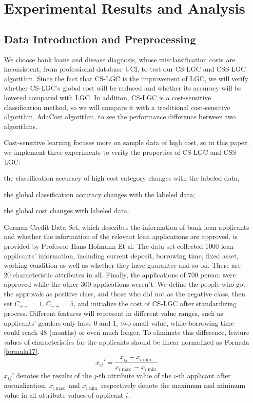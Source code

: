 \documentclass{svjour3}                     %
\begin{document}
\section{Experimental Results and Analysis}
\subsection{Data Introduction and Preprocessing}\label{sec:preexp}
We choose bank loans and disease diagnosis, whose misclassification costs are inconsistent, from professional database UCI\cite{Lichman:2013}, to
test our CS-LGC and CSS-LGC algorithm. Since the fact that CS-LGC is the improvement of LGC, we will verify whether CS-LGC’s global cost will be reduced and whether its accuracy will be lowered compared with LGC. In addition, CS-LGC is a cost-sensitive classification method, so we will compare it with a traditional cost-sensitive algorithm, AdaCost algorithm, to see the performance difference between two algorithms.

Cost-sensitive learning focuses more on sample data of high cost, so in this paper, we implement three experiments to verity the properties of CS-LGC and CSS-LGC:
\begin{inparaenum}[(1)]
  \item the classification accuracy of high cost category changes with the labeled data;
  \item the global classification accuracy changes with the labeled data;
  \item the global cost changes with labeled data.
\end{inparaenum}

German Credit Data Set\cite{germandata}, which describes the information of bank loan applicants and whether the information of the relevant loan applications are approved, is provided by Professor Hans Hofmann Et al. The data set collected 1000 loan applicants' information, including current deposit, borrowing time, fixed asset, working condition as well as whether they have guarantee and so on. There are 20 characteristic attributes in all. Finally, the applications of 700 person were approved while the other 300 applications weren't. We define the people who got the approvals as positive class, and those who did not as the negative class, then set ${C_{ +  - }} = 1$, ${C_{ -  + }} = 5$, and initialize the cost of CS-LGC after standardizing process. Different features will represent in different value ranges, such as applicants' genders only have 0 and 1, two small value, while borrowing time could reach 48 (months) or even much longer. To eliminate this difference, feature values  of characteristics for the applicants should be linear normalized as Formula \ref{formula17}.
\begin{equation} \label{formula17}
  {x_{ij}}' = \frac{{{x_{ij}} - {x_{i\min }}}}{{{x_{i\max }} - {x_{i\min }}}}
\end{equation}
${x_{ij}}'$ denotes the results of the $j$-th attribute value of the $i$-th applicant after normalization, ${{x_{i\max }}}$ and ${{x_{i\min }}}$ respectively denote the maximum and minimum value in all attribute values of applicant $i$.
\end{document}
